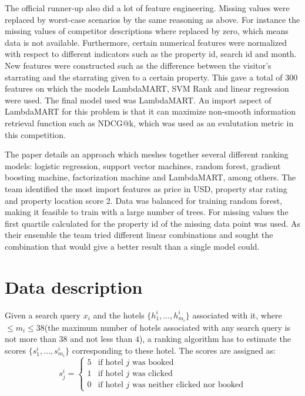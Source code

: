\documentclass{llncs}
\begin{document}
The official runner-up also did a lot of feature engineering. Missing values were replaced by worst-case scenarios by the same reasoning as above. For instance the missing values of competitor descriptions where replaced by zero, which means data is not available. Furthermore, certain numerical features were normalized with respect to different indicators such as the property id, search id and month. New features were constructed such as the difference between the visitor's starrating and the starrating given to a certain property. This gave a total of 300 features on which the models LambdaMART, SVM Rank and linear regression were used. The final model used was LambdaMART. An import aspect of LambdaMART for this problem is that it can maximize non-smooth information retrieval function such as NDCG@k, which was used as an evalutation metric in this competition.

The paper \cite{DBLP:journals/corr/LiuXZYPLSW13} details an approach which meshes together several different ranking models: logistic regression, support vector machines, random forest, gradient boosting machine, factorization machine and LambdaMART, among others. The team identified the most import features as price in USD, property star rating and property location score 2. Data was balanced for training random forest, making it feasible to train with a large number of trees.  For missing values the first quartile calculated for the property id of the missing data point was used. As their ensemble the team tried different linear combinations and sought the combination that would give a better result than a single model could.
 
\section{Data description}
Given a search query $x_{i}$ and the hotels $\{h_{1}^{i},\dots,h_{m_{i}}^{i}\}$ associated with it, where $\leq m_{i} \leq 38$(the maximum number of hotels associated with any search query is not more than $38$ and not less than $4$), a ranking algorithm has to estimate the scores  $\{s_{1}^{i},\dots,s_{m_{i}}^{i}\}$ corresponding to these hotel. The scores are assigned as:
$$
s_{j}^{i}=
\left\{
	\begin{array}{ll}
		5  & \mbox{if hotel $j$ was booked }   \\
		1 & \mbox{if hotel $j$ was clicked }  \\
		0 & \mbox{if hotel $j$ was neither clicked nor booked}
	\end{array}
\right.
$$
  
\end{document}
